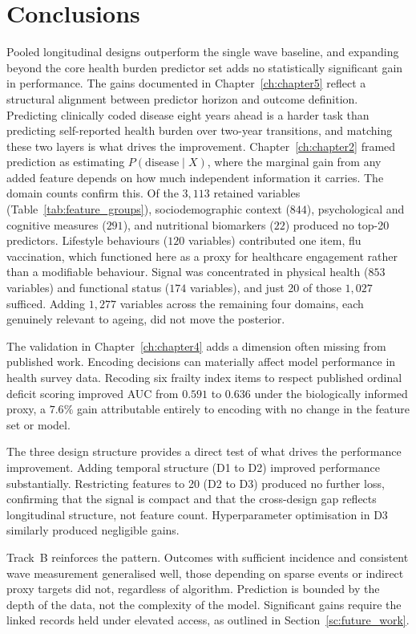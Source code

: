 \section{Conclusions}
Pooled longitudinal designs outperform the single wave baseline, and expanding beyond the core health burden predictor set adds no statistically significant gain in performance. The gains documented in Chapter~\ref{ch:chapter5} reflect a structural alignment between predictor horizon and outcome definition. Predicting clinically coded disease eight years ahead is a harder task than predicting self-reported health burden over two-year transitions, and matching these two layers is what drives the improvement. Chapter~\ref{ch:chapter2} framed prediction as estimating $P(\text{disease} \mid X)$, where the marginal gain from any added feature depends on how much independent information it carries. The domain counts confirm this. Of the $3{,}113$ retained variables (Table~\ref{tab:feature_groups}), sociodemographic context ($844$), psychological and cognitive measures ($291$), and nutritional biomarkers ($22$) produced no top-20 predictors. Lifestyle behaviours ($120$ variables) contributed one item, flu vaccination, which functioned here as a proxy for healthcare engagement rather than a modifiable behaviour. Signal was concentrated in physical health ($853$ variables) and functional status ($174$ variables), and just 20 of those $1{,}027$ sufficed. Adding $1{,}277$ variables across the remaining four domains, each genuinely relevant to ageing, did not move the posterior.

The validation in Chapter~\ref{ch:chapter4} adds a dimension often missing from published work. Encoding decisions can materially affect model performance in health survey data. Recoding six frailty index items to respect published ordinal deficit scoring improved \gls{AUC} from $0.591$ to $0.636$ under the biologically informed proxy, a $7.6\%$ gain attributable entirely to encoding with no change in the feature set or model.

The three design structure provides a direct test of what drives the performance improvement. Adding temporal structure (D1 to D2) improved performance substantially. Restricting features to 20 (D2 to D3) produced no further loss, confirming that the signal is compact and that the cross-design gap reflects longitudinal structure, not feature count. Hyperparameter optimisation in D3 similarly produced negligible gains.

Track~B reinforces the pattern. Outcomes with sufficient incidence and consistent wave measurement generalised well, those depending on sparse events or indirect proxy targets did not, regardless of algorithm. Prediction is bounded by the depth of the data, not the complexity of the model. Significant gains require the linked records held under elevated access, as outlined in Section~\ref{sc:future_work}.

